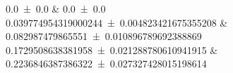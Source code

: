 \num{0.0 \pm 0.0}		&		\num{0.0 \pm 0.0}	 \\ 
\num{0.039774954319000244 \pm 0.004823421675355208}		&		\num{0.082987479865551 \pm 0.010896789692388869}	 \\ 
\num{0.1729508638381958 \pm 0.021288780610941915}		&		\num{0.2236846387386322 \pm 0.027327428015198614}	 \\ 
